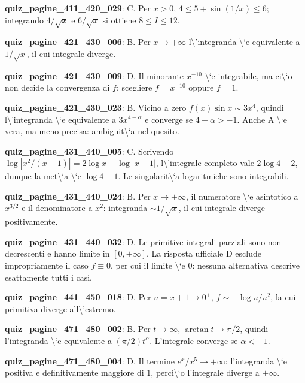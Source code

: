 \documentclass[11pt,a4paper]{article}
\newcounter{quiz}
\begin{document}
\noindent\textbf{quiz\_pagine\_411\_420\_029}: C. Per $x>0$, $4\leq5+\sin(1/x)\leq6$; integrando $4/\sqrt x$ e $6/\sqrt x$ si ottiene $8\leq I\leq12$.\par\medskip
\noindent\textbf{quiz\_pagine\_421\_430\_006}: B. Per $x\to+\infty$ l\textbackslash{}'integranda \textbackslash{}`e equivalente a $1/\sqrt x$, il cui integrale diverge.\par\medskip
\noindent\textbf{quiz\_pagine\_421\_430\_009}: D. Il minorante $x^{-10}$ \textbackslash{}`e integrabile, ma ci\textbackslash{}`o non decide la convergenza di $f$: scegliere $f=x^{-10}$ oppure $f=1$.\par\medskip
\noindent\textbf{quiz\_pagine\_421\_430\_023}: B. Vicino a zero $f(x)\sin x\sim3x^4$, quindi l\textbackslash{}'integranda \textbackslash{}`e equivalente a $3x^{4-\alpha}$ e converge se $4-\alpha>-1$. Anche A \textbackslash{}`e vera, ma meno precisa: ambiguit\textbackslash{}`a nel quesito.\par\medskip
\noindent\textbf{quiz\_pagine\_431\_440\_005}: C. Scrivendo $\log|x^2/(x-1)|=2\log x-\log|x-1|$, l\textbackslash{}'integrale completo vale $2\log4-2$, dunque la met\textbackslash{}`a \textbackslash{}`e $\log4-1$. Le singolarit\textbackslash{}`a logaritmiche sono integrabili.\par\medskip
\noindent\textbf{quiz\_pagine\_431\_440\_024}: B. Per $x\to+\infty$, il numeratore \textbackslash{}`e asintotico a $x^{3/2}$ e il denominatore a $x^2$: integranda $\sim1/\sqrt{x}$, il cui integrale diverge positivamente.\par\medskip
\noindent\textbf{quiz\_pagine\_431\_440\_032}: D. Le primitive integrali parziali sono non decrescenti e hanno limite in $[0,+\infty]$. La risposta ufficiale D esclude impropriamente il caso $f\equiv0$, per cui il limite \textbackslash{}`e $0$: nessuna alternativa descrive esattamente tutti i casi.\par\medskip
\noindent\textbf{quiz\_pagine\_441\_450\_018}: D. Per $u=x+1\to0^+$, $f\sim-\log u/u^2$, la cui primitiva diverge all\textbackslash{}'estremo.\par\medskip
\noindent\textbf{quiz\_pagine\_471\_480\_002}: B. Per $t\to\infty$, $\arctan t\to\pi/2$, quindi l'integranda \textbackslash{}`e equivalente a $(\pi/2)t^\alpha$. L'integrale converge se $\alpha<-1$.\par\medskip
\noindent\textbf{quiz\_pagine\_471\_480\_004}: D. Il termine $e^x/x^5\to+\infty$: l'integranda \textbackslash{}`e positiva e definitivamente maggiore di $1$, perci\textbackslash{}`o l'integrale diverge a $+\infty$.\par\medskip
\end{document}
